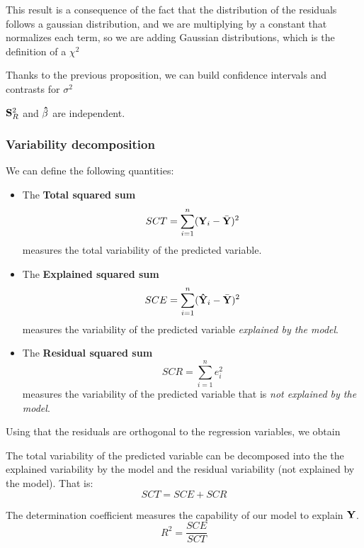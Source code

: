 This result is a consequence of the fact that the distribution of the residuals follows a gaussian distribution, and we are multiplying by a constant that normalizes each term, so we are adding Gaussian distributions, which is the definition of a \(\chi^2\)

\begin{note}
Thanks to the previous proposition, we can build confidence intervals and contrasts for \(\sigma^2\)
\end{note}

\begin{nprop}
\(\mathbf{S}_R^2\) and \( \mathbf{\hat \beta}\) are independent.
\end{nprop}

\subsubsection{Variability decomposition}

\begin{ndef}
We can define the following quantities:
\begin{itemize}
\item The \textbf{Total squared sum} \[
  SCT = \sum_{i=1}^n (\mathbf{Y}_i - \bar{\mathbf{Y}})^2
\]
measures the total variability of the predicted variable.

\item The \textbf{Explained squared sum} \[
  SCE = \sum_{i=1}^n ({\mathbf{\hat Y}}_i - \bar{\mathbf{Y}})^2
\]
measures the variability of the predicted variable \emph{explained by the model}.

\item The \textbf{Residual squared sum} \[
  SCR = \sum_{i=1}^n e_i^2
\]
measures the variability of the predicted variable that is \emph{not explained by the model}.
\end{itemize}
\end{ndef}

Using that the residuals are orthogonal to the regression variables, we obtain
\begin{ncor}
  The total variability of the predicted variable can be decomposed into the the explained variability by the model and the residual variability (not explained by the model). That is:
\[
SCT = SCE  + SCR  
\]
\end{ncor}

\begin{ndef}
The determination coefficient measures the capability of our model to explain \(\mathbf{Y}\).
\[
R^2 = \frac{SCE}{SCT}  
\]
\end{ndef}

